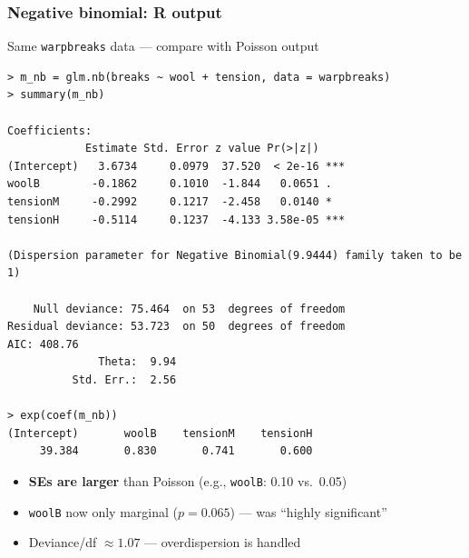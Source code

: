\begin{frame}[fragile]
\frametitle{Negative binomial: R output}
\centering

\vspace{2pt}
{\scriptsize Same \texttt{warpbreaks} data --- compare with Poisson output}

\vspace{4pt}

{\fontsize{4.5pt}{5.5pt}\selectfont
\begin{verbatim}
> m_nb = glm.nb(breaks ~ wool + tension, data = warpbreaks)
> summary(m_nb)

Coefficients:
            Estimate Std. Error z value Pr(>|z|)
(Intercept)   3.6734     0.0979  37.520  < 2e-16 ***
woolB        -0.1862     0.1010  -1.844   0.0651 .
tensionM     -0.2992     0.1217  -2.458   0.0140 *
tensionH     -0.5114     0.1237  -4.133 3.58e-05 ***

(Dispersion parameter for Negative Binomial(9.9444) family taken to be 1)

    Null deviance: 75.464  on 53  degrees of freedom
Residual deviance: 53.723  on 50  degrees of freedom
AIC: 408.76
              Theta:  9.94
          Std. Err.:  2.56

> exp(coef(m_nb))
(Intercept)       woolB    tensionM    tensionH
     39.384       0.830       0.741       0.600
\end{verbatim}
}

\vspace{4pt}

\begin{itemize}
\item {\small \textbf{SEs are larger} than Poisson (e.g., \texttt{woolB}: 0.10 vs.\ 0.05)}
\item {\small \texttt{woolB} now only marginal ($p = 0.065$) --- was ``highly significant''}
\item {\small Deviance/df $\approx 1.07$ --- overdispersion is handled}
\end{itemize}

\end{frame}

